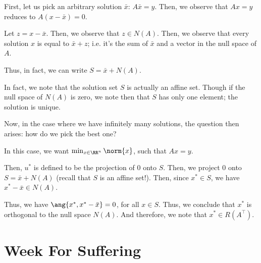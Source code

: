\documentclass[openany]{book}
\begin{document}
\begin{example}
	First, let us pick an arbitrary solution $\bar x$: $A \bar x = y$. Then, we observe that $Ax = y$ reduces to $A(x - \bar x) = 0$.
	
	Let $z = x - \bar x$. Then, we observe that $z \in N(A)$. Then, we observe that every solution $x$ is equal to $\bar x + z$; i.e. it's the sum of $\bar x$ and a vector in the null space of $A$.
\end{example}

Thus, in fact, we can write $S = \bar x + N(A)$.

\begin{rmk}
	In fact, we note that the solution set $S$ is actually an affine set. Though if the null space of $N(A)$ is zero, we note then that $S$ has only one element; the solution is unique.
\end{rmk}

Now, in the case where we have infinitely many solutions, the question then arises: how do we pick the best one?

In this case, we want $\min_{x \in \RR^{n}} \norm{x}$, such that $Ax = y$.

Then, $u^{*}$ is defined to be the projection of $0$ onto $S$. Then, we project $0$ onto $S = \bar x + N(A)$ (recall that $S$ is an affine set!). Then, since $x^{*} \in S$, we have $x^{*} - \bar x \in N(A)$.

Thus, we have $\ang{x^{*}, x^{*} - \bar x} = 0$, for all $x \in S$. Thus, we conclude that $x^{*}$ is orthogonal to the null space $N(A)$. And therefore, we note that $x^{*} \in R(A^{\intercal})$.

\chapter{Week For Suffering}
\end{document}
